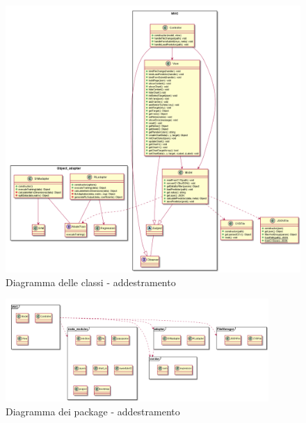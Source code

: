 \documentclass[../manuale-sviluppatore.tex]{subfiles}
\begin{document}
\begin{figure}[H]
   \begin{center}
        \includegraphics[width=14cm]{img/classDiagramTA.png}
        \caption{Diagramma delle classi - addestramento}
        \label{fig:diagramma_classi}
    \end{center}
\end{figure}

\begin{figure}[H]
    \begin{center}
         \includegraphics[width=10cm]{img/packagesDiagramTA.png}
         \caption{Diagramma dei package - addestramento}
         \label{fig:daa}
     \end{center}
 \end{figure}
\end{document}
